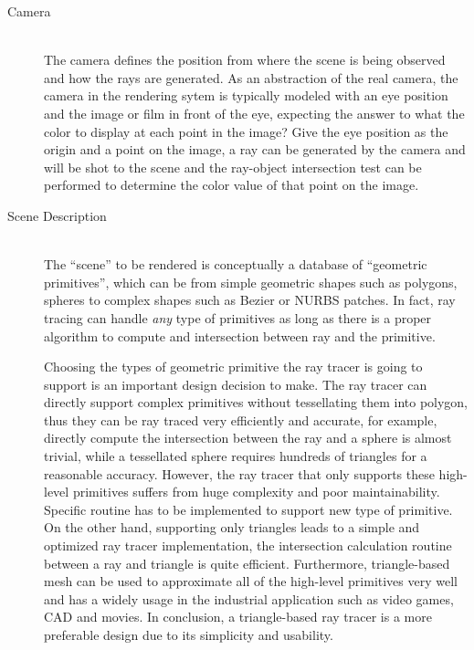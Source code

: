 \begin{description} 	
	\item[Camera] \hfill \\
		The camera defines the position from where the scene is being observed and how the rays are generated. As an abstraction of the real camera, the camera in the rendering sytem is typically modeled with an eye position and the image or film in front of the eye, expecting the answer to what the color to display at each point in the image? Give the eye position as the origin and a point on the image, a ray can be generated by the camera and will be shot to the scene and the ray-object intersection test can be performed to determine the color value of that point on the image.  

	\item[Scene Description] \hfill \\ 
		The ``scene'' to be rendered is conceptually a database of ``geometric primitives'', which can be from simple geometric shapes such as polygons, spheres to complex shapes such as Bezier or NURBS patches. In fact, ray tracing can handle \emph{any} type of primitives as long as there is a proper algorithm to compute and intersection between ray and the primitive.

		Choosing the types of geometric primitive the ray tracer is going to support is an important design decision to make. The ray tracer can directly support complex primitives without tessellating them into polygon, thus they can be ray traced very efficiently and accurate, for example, directly compute the intersection between the ray and a sphere is almost trivial, while a tessellated sphere requires hundreds of triangles for a reasonable accuracy. However, the ray tracer that only supports these high-level primitives suffers from huge complexity and poor maintainability. Specific routine has to be implemented to support new type of primitive. On the other hand, supporting only triangles leads to a simple and optimized ray tracer implementation, the intersection calculation routine between a ray and triangle is quite efficient. Furthermore, triangle-based mesh can be used to approximate all of the high-level primitives very well and has a widely usage in the industrial application such as video games, CAD and movies. In conclusion, a triangle-based ray tracer is a more preferable design due to its simplicity and usability.


\end{description}
